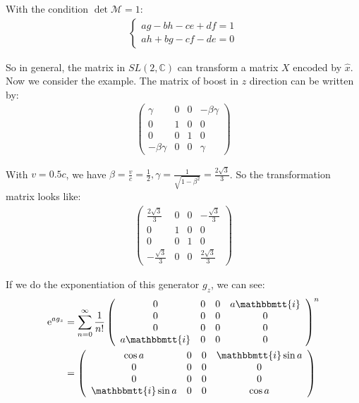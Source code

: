 \documentclass[]{ctexart}
\newcommand{\mi}{\mathbbmtt{i}}
\newcommand{\me}{\mathrm{e}}
\begin{document}
			With the condition $\det \mathcal{M}=1$:
				\begin{equation*}
				\begin{aligned}
					\begin{cases}
						a g-b h-c e+d f=1\\
						a h+b g-c f-d e=0
					\end{cases}
				\end{aligned}
				\end{equation*}
			
			So in general, the matrix in $SL(2,\mathbb{C})$ can transform a matrix $X$ encoded by $\hat{x}$. Now we consider the example. The matrix of boost in $z$ direction can be written by:
				\begin{equation*}
				\begin{aligned}
					\left(\begin{array}{cccc}
					\gamma & 0 & 0 & -\beta \gamma \\
					0 & 1 & 0 & 0 \\
					0 & 0 & 1 & 0 \\
					-\beta \gamma & 0 & 0 & \gamma
					\end{array}\right)
				\end{aligned}
				\end{equation*}
			
			With $v=0.5c$, we have $\beta=\frac{v}{c}=\frac{1}{2},\gamma=\frac{1}{\sqrt{1-\beta^2}}=\frac{2\sqrt{3}}{3}$. So the transformation matrix looks like:
				\begin{equation*}
				\begin{aligned}
					\left(\begin{array}{cccc}
					\frac{2\sqrt{3}}{3} & 0 & 0 & -\frac{\sqrt{3}}{3}\\
					0 & 1 & 0 & 0 \\
					0 & 0 & 1 & 0 \\
					-\frac{\sqrt{3}}{3} & 0 & 0 & \frac{2\sqrt{3}}{3}
					\end{array}\right)
				\end{aligned}
				\end{equation*}
			
			If we do the exponentiation of this generator $g_z$, we can see:
				\begin{equation*}
				\begin{aligned}
					\me^{a g_z}&=\sum_{n=0}^{\infty}\frac{1}{n!}
					\left(\begin{array}{cccc}
					0 & 0 & 0 & a\mi \\
					0 & 0 & 0 & 0 \\
					0 & 0 & 0 & 0 \\
					a\mi  & 0 & 0 & 0
					\end{array}\right)^n\\
					&=
					\left(\begin{array}{cccc}
					\cos a & 0 & 0 & \mi \sin a\\
					0 & 0 & 0 & 0 \\
					0 & 0 & 0 & 0 \\
					\mi \sin a  & 0 & 0 & \cos a
					\end{array}\right)
				\end{aligned}
				\end{equation*}
			
\end{document}
